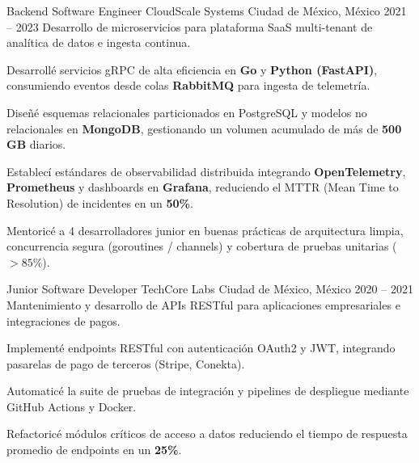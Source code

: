 \cvExperienceItem
    {Backend Software Engineer}
    {CloudScale Systems}
    {Ciudad de México, México}
    {2021 -- 2023}
    {Desarrollo de microservicios para plataforma SaaS multi-tenant de analítica de datos e ingesta continua.}
    {
        \begin{cvItemize}
            \item Desarrollé servicios gRPC de alta eficiencia en \textbf{Go} y \textbf{Python (FastAPI)}, consumiendo eventos desde colas \textbf{RabbitMQ} para ingesta de telemetría.
            \item Diseñé esquemas relacionales particionados en PostgreSQL y modelos no relacionales en \textbf{MongoDB}, gestionando un volumen acumulado de más de \textbf{500 GB} diarios.
            \item Establecí estándares de observabilidad distribuida integrando \textbf{OpenTelemetry}, \textbf{Prometheus} y dashboards en \textbf{Grafana}, reduciendo el MTTR (Mean Time to Resolution) de incidentes en un \textbf{50\%}.
            \item Mentoricé a 4 desarrolladores junior en buenas prácticas de arquitectura limpia, concurrencia segura (goroutines / channels) y cobertura de pruebas unitarias ($>85\%$).
        \end{cvItemize}
    }

\cvExperienceItem
    {Junior Software Developer}
    {TechCore Labs}
    {Ciudad de México, México}
    {2020 -- 2021}
    {Mantenimiento y desarrollo de APIs RESTful para aplicaciones empresariales e integraciones de pagos.}
    {
        \begin{cvItemize}
            \item Implementé endpoints RESTful con autenticación OAuth2 y JWT, integrando pasarelas de pago de terceros (Stripe, Conekta).
            \item Automaticé la suite de pruebas de integración y pipelines de despliegue mediante GitHub Actions y Docker.
            \item Refactoricé módulos críticos de acceso a datos reduciendo el tiempo de respuesta promedio de endpoints en un \textbf{25\%}.
        \end{cvItemize}
    }

